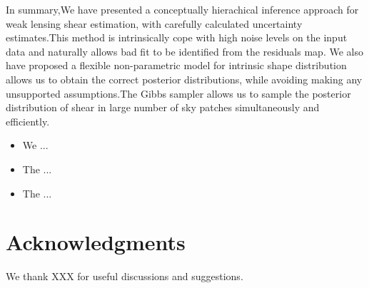 \documentclass[useAMS,usenatbib]{mn2e}
\begin{document}
\label{sec:conclusions}

In summary,We have presented a conceptually hierachical inference
approach for weak lensing shear estimation, with carefully calculated 
uncertainty estimates.This method is intrinsically cope with high noise
levels on the input data and naturally allows bad fit to be identified 
from the residuals map. We also have proposed a flexible non-parametric model 
for intrinsic shape distribution allows us to obtain the correct posterior 
distributions, while avoiding making any unsupported assumptions.The Gibbs
sampler allows us to sample the posterior distribution of shear in large number of
sky patches simultaneously and efficiently.
\begin{itemize}
\item We ...
\item The ...
\item The ...
\end{itemize}



\section*{Acknowledgments}

We thank XXX for useful discussions and suggestions.



% 
% 
% 
% 






 





\label{lastpage} \bsp
\end{document}
